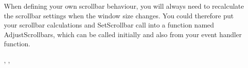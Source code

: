 When defining your own scrollbar behaviour, you will always need to recalculate
the scrollbar settings when the window size changes. You could therefore put your
scrollbar calculations and SetScrollbar
call into a function named AdjustScrollbars, which can be called initially and also
from your  event handler function.


,\rtfsp
{}, 

\begin{comment}
\membersection{wxWindow::SetScrollPage}\label{wxwindowsetscrollpage}

\func{virtual void}{SetScrollPage}{\param{int }{orientation}, \param{int }{pageSize}, \param{const bool }{refresh = TRUE}}

Sets the page size of one of the built-in scrollbars.

\wxheading{Parameters}

\docparam{orientation}{Determines the scrollbar whose page size is to be set. May be wxHORIZONTAL or wxVERTICAL.}

\docparam{pageSize}{Page size in scroll units.}

\docparam{refresh}{TRUE to redraw the scrollbar, FALSE otherwise.}

\wxheading{Remarks}

The page size of a scrollbar is the number of scroll units that the scroll thumb travels when you
click on the area above/left of or below/right of the thumb. Normally you will want a whole visible
page to be scrolled, i.e. the size of the current view (perhaps the window client size). This
value has to be adjusted when the window is resized, since the page size will have changed.

In addition to specifying how far the scroll thumb travels when paging, in Motif and some versions of Windows
the thumb changes size to reflect the page size relative to the length of the document. When the
document size is only slightly bigger than the current view (window) size, almost all of the scrollbar
will be taken up by the thumb. When the two values become the same, the scrollbar will (on some systems)
disappear.

Currently, this function should be called before SetPageRange, because of a quirk in the Windows
handling of pages and ranges.

\wxheading{See also}

\helpref{wxWindow::SetScrollPos}{wxwindowsetscrollpos},\rtfsp
\helpref{wxWindow::GetScrollPos}{wxwindowsetscrollpos},\rtfsp
\helpref{wxWindow::GetScrollPage}{wxwindowsetscrollpage},\rtfsp
\helpref{wxScrollBar}{wxscrollbar}, \helpref{wxScrolledWindow}{wxscrolledwindow}
\end{comment}

